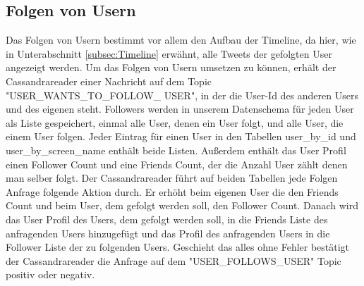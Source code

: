 \subsection{Folgen von Usern}
Das Folgen von Usern bestimmt vor allem den Aufbau der Timeline, da hier, wie in Unterabschnitt \ref{subsec:Timeline} erwähnt, alle Tweets der gefolgten User angezeigt werden. Um das Folgen von Usern umsetzen zu können, erhält der Cassandrareader einer Nachricht auf dem Topic "USER\_WANTS\_TO\_FOLLOW\_ USER", in der die User-Id des anderen Users und des eigenen steht. Followers werden in unserem Datenschema für jeden User als Liste gespeichert, einmal alle User, denen ein User folgt, und alle User, die einem User folgen. Jeder Eintrag für einen User in den Tabellen user\_by\_id und user\_by\_screen\_name enthält beide Listen. Außerdem enthält das User Profil einen Follower Count und eine Friends Count, der die Anzahl User zählt denen man selber folgt. Der Cassandrareader führt auf beiden Tabellen jede Folgen Anfrage folgende Aktion durch. Er erhöht beim eigenen User die den Friends Count und beim User, dem gefolgt werden soll, den Follower Count. Danach wird das User Profil des Users, dem gefolgt werden soll, in die Friends Liste des anfragenden Users hinzugefügt und das Profil des anfragenden Users in die Follower Liste der zu folgenden Users. Geschieht das alles ohne Fehler bestätigt der Cassandrareader die Anfrage auf dem "USER\_FOLLOWS\_USER" Topic positiv oder negativ.
